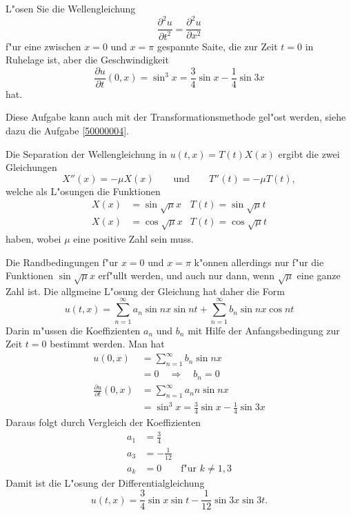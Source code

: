 L"osen Sie die Wellengleichung
\[
\frac{\partial^2 u}{\partial t^2}=\frac{\partial^2 u}{\partial x^2}
\]
f"ur eine zwischen $x=0$ und $x=\pi$ gespannte Saite,
die zur Zeit $t=0$ in Ruhelage ist, aber die Geschwindigkeit
\[
\frac{\partial u}{\partial t}(0, x)
=
\sin^3 x=\frac34\sin x-\frac14\sin 3x
\]
hat.

\begin{hinweis}
Diese Aufgabe kann auch mit der Transformationsmethode gel"ost werden,
siehe dazu die Aufgabe \ref{50000004}.
\end{hinweis}

\begin{loesung}
Die Separation der Wellengleichung in $u(t,x)=T(t)X(x)$ ergibt die
zwei Gleichungen
\[
X''(x)=-\mu X(x)\qquad\text{und}\qquad T''(t)=-\mu T(t),
\]
welche als L"osungen die Funktionen
\begin{align*}
X(x)&=\sin\sqrt{\mu}x & T(t)=\sin\sqrt{\mu}t\\
X(x)&=\cos\sqrt{\mu}x & T(t)=\cos\sqrt{\mu}t
\end{align*}
haben, wobei $\mu$ eine positive Zahl sein muss.

Die Randbedingungen f"ur $x=0$ und $x=\pi$ k"onnen allerdings nur
f"ur die Funktionen $\sin\sqrt{\mu}x$ erf"ullt werden, und auch nur dann,
wenn $\sqrt{\mu}$ eine ganze Zahl ist. Die allgmeine L"osung der Gleichung
hat daher die Form
\[
u(t,x)
=
\sum_{n=1}^\infty a_n\sin nx \sin nt+\sum_{n=1}^\infty b_n\sin nx\cos nt
\]
Darin m"ussen die Koeffizienten $a_n$ und $b_n$ mit Hilfe der 
Anfangsbedingung zur Zeit $t=0$ bestimmt werden. Man hat
\begin{align*}
u(0,x)&=
\sum_{n=1}^\infty b_n\sin nx
\\
&=0\quad\Rightarrow\quad b_n=0
\\
\frac{\partial u}{\partial t}(0,x)
&=
\sum_{n=1}^\infty a_nn\sin nx
\\
&=
\sin^3 x=\frac34\sin x-\frac14\sin 3x
\end{align*}
Daraus folgt durch Vergleich der Koeffizienten
\begin{align*}
a_1&=\frac34\\
a_3&=-\frac{1}{12}\\
a_k&=0\qquad\text{f"ur $k\ne 1,3$}
\end{align*}
Damit ist die L"osung der Differentialgleichung
\[
u(t,x)
= \frac34\sin x \sin t -\frac1{12}\sin 3x \sin 3t.
\]
\end{loesung}
